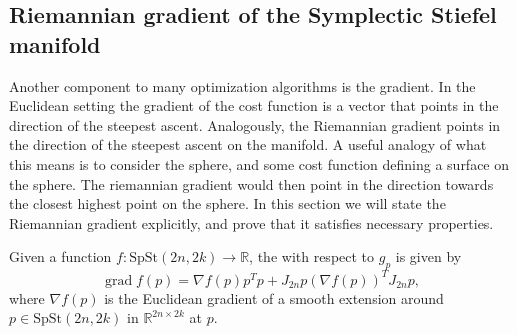 \subsection{Riemannian gradient of the Symplectic Stiefel manifold}
Another component to many optimization algorithms is the gradient. In the Euclidean setting the gradient of the cost function is a vector that points in the direction of the steepest ascent. Analogously, the Riemannian gradient points in the direction of the steepest ascent on the manifold. A useful analogy of what this means is to consider the sphere, and some cost function defining a surface on the sphere. The riemannian gradient would then point in the direction towards the closest highest point on the sphere. In this section we will state the Riemannian gradient explicitly, and prove that it satisfies necessary properties. 
\begin{proposition}
    Given a function $f\colon \mathrm{SpSt}(2n, 2k)\xrightarrow{}\mathbb{R}$, the  with respect to $g_{p}$ is given by
    \begin{equation}\label{eq:rie_grad}
        \operatorname{grad}f(p)=\nabla f(p)p^{T}p+J_{2n}p(\nabla f(p))^{T}J_{2n}p,
    \end{equation}
    where $\nabla f(p)$ is the Euclidean gradient of a smooth extension around $p\in \mathrm{SpSt}(2n, 2k)$ in $\mathbb{R}^{2n\times2k}$ at $p$.
\end{proposition}

